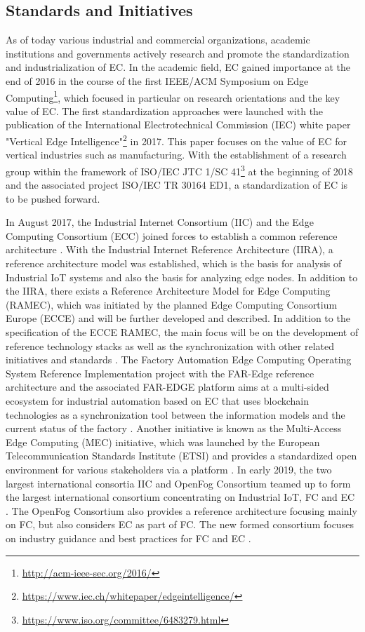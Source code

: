 \subsection{Standards and Initiatives}
As of today various industrial and commercial organizations, academic institutions and governments actively research and promote the standardization and industrialization of EC.
In the academic field, EC gained importance at the end of 2016 in the course of the first IEEE/ACM Symposium on Edge Computing\footnote{\url{http://acm-ieee-sec.org/2016/}}, which focused in particular on research orientations and the key value of EC.
The first standardization approaches were launched with the publication of the International Electrotechnical Commission (IEC) white paper "Vertical Edge Intelligence"\footnote{\url{https://www.iec.ch/whitepaper/edgeintelligence/}} in 2017. This paper focuses on the value of EC for vertical industries such as manufacturing.
With the establishment of a research group within the framework of ISO/IEC JTC 1/SC 41\footnote{\url{https://www.iso.org/committee/6483279.html}} at the beginning of 2018 and the associated project ISO/IEC TR 30164 ED1, a standardization of EC is to be pushed forward.\par
In August 2017, the Industrial Internet Consortium (IIC) and the Edge Computing Consortium (ECC) joined forces to establish a common reference architecture \cite{IICEC2}.
With the Industrial Internet Reference Architecture (IIRA), a reference architecture model was established, which is the basis for analysis of Industrial IoT systems and also the basis for analyzing edge nodes.
In addition to the IIRA, there exists a Reference Architecture Model for Edge Computing (RAMEC), which was initiated by the planned Edge Computing Consortium Europe (ECCE) and will be further developed and described. In addition to the specification of the ECCE RAMEC, the main focus will be on the development of reference technology stacks as well as the synchronization with other related initiatives and standards \cite{ECCE}.
The Factory Automation Edge Computing Operating System Reference Implementation project with the FAR-Edge reference architecture and the associated FAR-EDGE platform aims at a multi-sided ecosystem for industrial automation based on EC that uses blockchain technologies as a synchronization tool between the information models and the current status of the factory \cite{E4I}.
Another initiative is known as the Multi-Access Edge Computing (MEC) initiative, which was launched by the European Telecommunication Standards Institute (ETSI) and provides a standardized open environment for various stakeholders via a platform \cite{ETSI}.
In early 2019, the two largest international consortia IIC and OpenFog Consortium teamed up to form the largest international consortium concentrating on Industrial IoT, FC and EC \cite{IICOF}. The OpenFog Consortium also provides a reference architecture focusing mainly on FC, but also considers EC as part of FC. The new formed consortium focuses on industry guidance and best practices for FC and EC \cite{IICEC}.